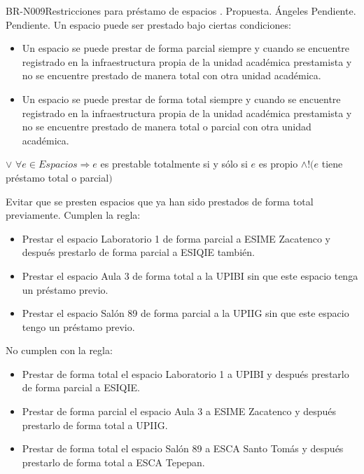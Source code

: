 \begin{BusinessRule}{BR-N009}{Restricciones para préstamo de espacios}
	{\bcCondition}    %
	{\btEnabler}     %
	{\blControlling}    %
	.
	\BRItem[Estado] Propuesta.
	 Ángeles
	 Pendiente.
	 Pendiente.
	\BRItem[Descripción] Un espacio puede ser prestado bajo ciertas condiciones:
			\begin{itemize}
				\item Un espacio se puede prestar de forma parcial  siempre y cuando se encuentre registrado en la infraestructura propia de la unidad académica prestamista y no se encuentre prestado de manera total con otra unidad académica.
				\item Un espacio se puede prestar de forma total siempre y cuando se encuentre registrado en la infraestructura propia de la unidad académica prestamista y no se encuentre prestado de manera total o parcial con otra unidad académica.
			\end{itemize} %
	 $\lor$
	{$ \forall e \in Espacios \Rightarrow e $ es prestable totalmente si y sólo si $ e $ es propio $ \land !(e$ tiene préstamo total o parcial$)$}
	
	
	
	\BRItem[Motivación] Evitar que se presten espacios que ya han sido prestados de forma total previamente.
	 Cumplen la regla:
		\begin{itemize}
			\item Prestar el espacio Laboratorio 1 de forma parcial a ESIME Zacatenco y después prestarlo de forma parcial a ESIQIE también.
			\item Prestar el espacio Aula 3 de forma total a la UPIBI sin que este espacio tenga un préstamo previo.
			\item Prestar el espacio Salón 89 de forma parcial a la UPIIG sin que este espacio tengo un préstamo previo.
		\end{itemize}
	 No cumplen con la regla:
		\begin{itemize}
			\item Prestar de forma total el espacio Laboratorio 1 a UPIBI y después prestarlo de forma parcial a ESIQIE.
			\item Prestar de forma parcial el espacio Aula 3 a ESIME Zacatenco y después prestarlo de forma total a UPIIG.
			\item Prestar de forma total el espacio Salón 89 a ESCA Santo Tomás y después prestarlo de forma total a ESCA Tepepan.
		\end{itemize}
\end{BusinessRule}


